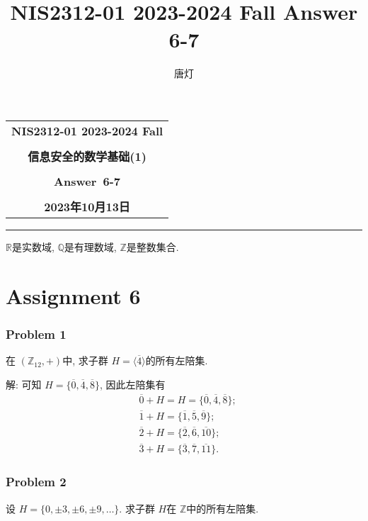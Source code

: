\documentclass[a4paper,12pt]{ctexart}
\title{NIS2312-01 2023-2024 Fall Answer 6-7}
\author{唐灯}
\newcommand{\Z}{\mathbb{Z}}
\newcommand{\Q}{\mathbb{Q}}
\newcommand{\R}{\mathbb{R}}
\begin{document}
  \begin{center}

  \vspace{-0.3in}
  \begin{tabular}{c}
    \textbf{\Large NIS2312-01 2023-2024 Fall} \\
    \textbf{\Large  } \\
    \textbf{\Large  信息安全的数学基础(1)} \\
    \textbf{\Large  } \\
    \textbf{\Large  Answer~6-7} \\
    \textbf{\Large  } \\
    \textbf{\Large 2023年10月13日} \\
  \end{tabular}
  \end{center}
  \noindent
  \rule{\linewidth}{0.4pt}
  
$ \R $是实数域, $ \Q $是有理数域, $ \Z $是整数集合.
\section*{Assignment 6}
\subsubsection*{Problem 1}
  在 $ (\Z_{12},+) $中, 求子群 $ H=\langle \overline{4}\rangle $的所有左陪集.
      
  解: 可知 $ H=\{\overline{0},\overline{4},\overline{8}\} $, 因此左陪集有
  \begin{align*}
    &\overline{0}+H=H=\{\overline{0},\overline{4},\overline{8}\};\\
    &\overline{1}+H=\{\overline{1},\overline{5},\overline{9}\};\\
    &\overline{2}+H=\{\overline{2},\overline{6},\overline{10}\};\\
    &\overline{3}+H=\{\overline{3},\overline{7},\overline{11}\}.
  \end{align*}

\subsubsection*{Problem 2} 
  设 $ H=\{0,\pm 3,\pm 6,\pm 9,\dots\} $. 求子群 $ H $在 $ \Z $中的所有左陪集.
  
\end{document}
